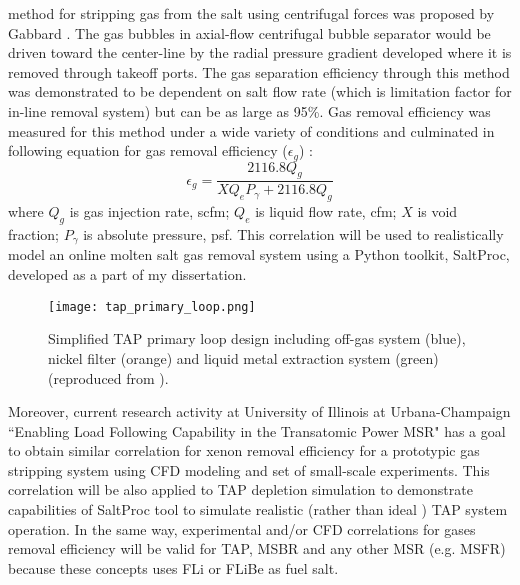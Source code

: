 method for 
stripping gas from the salt using centrifugal forces was proposed by Gabbard \cite{gabbard_development_1974}. The gas bubbles in axial-flow centrifugal bubble 
separator would be driven toward the center-line by the radial pressure gradient 
developed where it is removed through takeoff ports. The gas 
separation efficiency through this method was demonstrated to be dependent on 
salt flow rate (which is limitation factor for in-line removal system) but 
can be as large as 95\%. Gas removal efficiency was measured for this method 
under a wide variety of conditions and culminated in following equation for 
gas removal efficiency ($\epsilon_{g}$) \cite{gabbard_development_1974}:
\begin{equation} \label{eq:gas_eff}
\epsilon_g = \frac{2116.8 Q_g}{X Q_e P_{\gamma} + 2116.8 Q_g}
\end{equation}
where $Q_g$ is gas injection rate, scfm; $Q_e$ is liquid flow rate, cfm; $X$ is 
void fraction; $P_{\gamma}$ is absolute pressure, psf. This correlation will 
be used to realistically model an online molten salt gas removal system using 
a Python toolkit, SaltProc, developed as a part of my dissertation.
\begin{figure}[htp!] %
  \centering
		  \texttt{[image: tap\_primary\_loop.png]}
  \caption{Simplified \gls{TAP} primary loop design including off-gas system (blue), 
  nickel filter (orange) and liquid metal extraction system (green) (reproduced from \cite{transatomic_power_transatomic_2019}).}
  \label{fig:tap-reproc}
\end{figure}

Moreover, current research activity at University of Illinois at Urbana-Champaign 
``Enabling Load Following Capability in the Transatomic Power MSR" has a goal 
to obtain similar correlation for xenon removal efficiency for a prototypic 
gas stripping system using CFD modeling and set of small-scale experiments. This 
correlation will be also applied to \gls{TAP} depletion simulation to demonstrate capabilities of SaltProc tool to simulate realistic (rather than ideal 
\cite{transatomic_power_corporation_neutronics_2016, betzler_two-dimensional_2016,  betzler_assessment_2017}) \gls{TAP} 
system operation. In the same way, experimental and/or CFD correlations for gases 
removal efficiency will be valid for \gls{TAP}, \gls{MSBR} and any other \gls{MSR} 
(e.g. \gls{MSFR}) because these concepts uses FLi or FLiBe as fuel salt.

